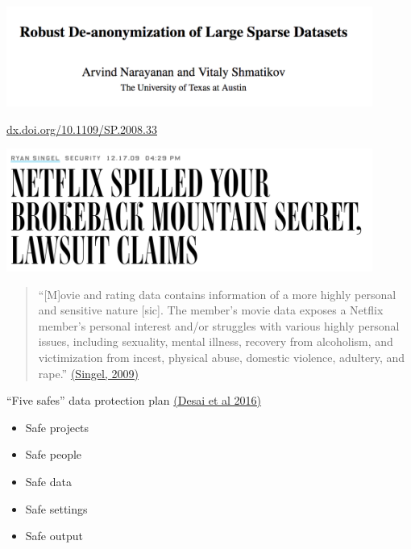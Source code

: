 \documentclass{beamer}
\def\vf{\vfill}
\begin{document}
\begin{frame}

\begin{center}
\includegraphics[width=0.9\textwidth]{figures/narayanan_robust_2008_title.png}
\end{center}
\vf

\tiny{\url{dx.doi.org/10.1109/SP.2008.33}}
\end{frame}
\begin{frame}

\begin{center}
\includegraphics[width=0.9\textwidth]{figures/singal_netflix_2009_title.png}
\end{center}


\begin{quote}
``[M]ovie and rating data contains information of a more highly personal and sensitive nature [sic]. The member's movie data exposes a Netflix member's personal interest and/or struggles with various highly personal issues, including sexuality, mental illness, recovery from alcoholism, and victimization from incest, physical abuse, domestic violence, adultery, and rape.''  \href{http://www.wired.com/2009/12/netflix-privacy-lawsuit/}{(Singel, 2009)}
\end{quote}

\end{frame}
\begin{frame}

``Five safes'' data protection plan \href{http://rsss.anu.edu.au/sites/default/files/Ritchie_5safes.pdf}{(Desai et al 2016)}
\begin{itemize}
\item Safe projects
\pause
\item Safe people
\pause
\item Safe data
\pause
\item Safe settings
\pause
\item Safe output
\end{itemize}

\end{frame}
\end{document}
